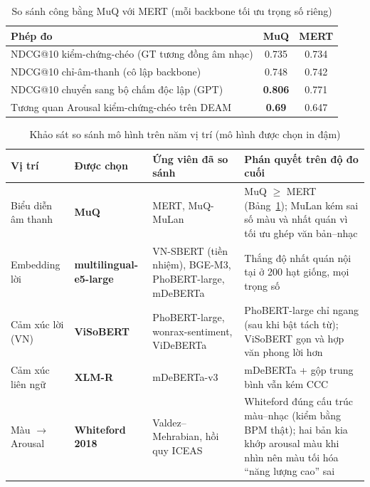 \documentclass[../DoAn.tex]{subfiles}
\begin{document}
\begin{table}[h!]
\centering
\caption{So sánh công bằng MuQ với MERT (mỗi backbone tối ưu trọng số riêng)}
\label{table:backbone}
\begin{tabular}{p{7.6cm} c c}
\toprule
\textbf{Phép đo} & \textbf{MuQ} & \textbf{MERT} \\
\midrule
NDCG@10 kiểm-chứng-chéo (GT tương đồng âm nhạc) & 0.735 & 0.734 \\
NDCG@10 chỉ-âm-thanh (cô lập backbone) & 0.748 & 0.742 \\
NDCG@10 chuyển sang bộ chấm độc lập (GPT) & \textbf{0.806} & 0.771 \\
Tương quan Arousal kiểm-chứng-chéo trên DEAM & \textbf{0.69} & 0.647 \\
\bottomrule
\end{tabular}
\end{table}

\begin{table}[h!]
\centering
\caption{Khảo sát so sánh mô hình trên năm vị trí (mô hình được chọn in đậm)}
\label{table:bakeoff}
\begin{tabular}{p{2.2cm} p{2.5cm} p{3.3cm} p{4.5cm}}
\toprule
\textbf{Vị trí} & \textbf{Được chọn} & \textbf{Ứng viên đã so sánh} & \textbf{Phán quyết trên độ đo cuối} \\
\midrule
Biểu diễn âm thanh & \textbf{MuQ} & MERT, MuQ-MuLan & MuQ $\geq$ MERT (Bảng~\ref{table:backbone}); MuLan kém sai số màu và nhất quán vì tối ưu ghép văn bản--nhạc \\
Embedding lời & \textbf{multilingual\hspace{0pt}-e5-large} & VN-SBERT (tiền nhiệm), BGE-M3, PhoBERT-large, mDeBERTa & Thắng độ nhất quán nội tại ở 200 hạt giống, mọi trọng số \\
Cảm xúc lời (VN) & \textbf{ViSoBERT} & PhoBERT-large, wonrax-sentiment, ViDeBERTa & PhoBERT-large chỉ ngang (sau khi bật tách từ); ViSoBERT gọn và hợp văn phong lời hơn \\
Cảm xúc liên ngữ & \textbf{XLM-R} & mDeBERTa-v3 & mDeBERTa + gộp trung bình vẫn kém CCC \\
Màu $\rightarrow$ Arousal & \textbf{Whiteford 2018} & Valdez--Mehrabian, hồi quy ICEAS & Whiteford đúng cấu trúc màu--nhạc (kiểm bằng BPM thật); hai bản kia khớp arousal màu khi nhìn nên màu tối hóa ``năng lượng cao'' sai \\
\bottomrule
\end{tabular}
\end{table}
\end{document}
